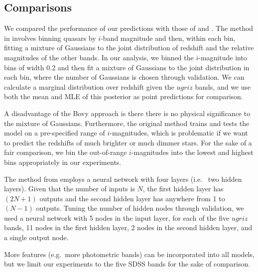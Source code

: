\documentclass{article} %
\begin{document}
\subsection{Comparisons}
We compared the performance of our predictions with those of \cite{bovy2012photometric} and \cite{brescia2013photometric}. The method in \cite{bovy2012photometric} involves binning
quasars by $i$-band magnitude and then, within each bin,
fitting a mixture of Gaussians to the joint distribution of
redshift and the relative magnitudes of the other bands. In our analysis, we binned
the $i$-magnitude
into bins of width 0.2 and then fit a mixture of Gaussians to the joint distribution in each bin,
where the number of Gaussians is chosen through validation. We can calculate a marginal distribution
over redshift given the $ugriz$ bands, and we use both the mean and MLE of this posterior as
point predictions for comparison.

A disadvantage of the Bovy approach is there there is no physical significance to the mixture
of Gaussians. 
Furthermore, the original method trains and tests the model on a pre-specified range of $i$-magnitudes, which is problematic if we want to predict
the redshifts of much brighter or much dimmer stars. For the sake of a fair comparison, we bin
the out-of-range $i$-magnitudes into the lowest and highest bins appropriately in our experiments.

The method from \cite{brescia2013photometric} employs a neural network with four layers (i.e.~ two hidden layers). Given that the number of inputs is $N$, the first hidden layer has $(2N + 1)$ outputs and the second hidden layer has anywhere from 1 to $(N - 1)$ outputs. Tuning the number of hidden nodes through validation, we used a neural network with 5 nodes in the input layer, for each of the five $ugriz$ bands, 11 nodes in the first hidden layer, 2 nodes in the second hidden layer, and a single output node. 

More features (e.g.~more photometric bands) can be incorporated into all models, but we limit our experiments to the five SDSS bands for the sake of comparison.  
\end{document}
